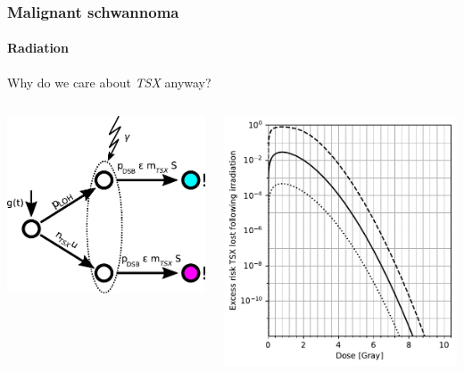 \documentclass{beamer}
\begin{document}
\begin{frame}
    \frametitle{Malignant schwannoma}
    \framesubtitle{Radiation}

    \begin{center}
        \tiny{Why do we care about \emph{TSX} anyway?}
    \end{center}

    \begin{columns}
        \begin{column}{0.5\textwidth}
        \includegraphics[width=\textwidth]{figures/radiation-model}
        \end{column}
        \begin{column}{0.5\textwidth}
        \includegraphics[width=\textwidth]{figures/SecondHitVariousTS-oct21}

\end{column}
\end{columns}
\end{frame}
\end{document}
